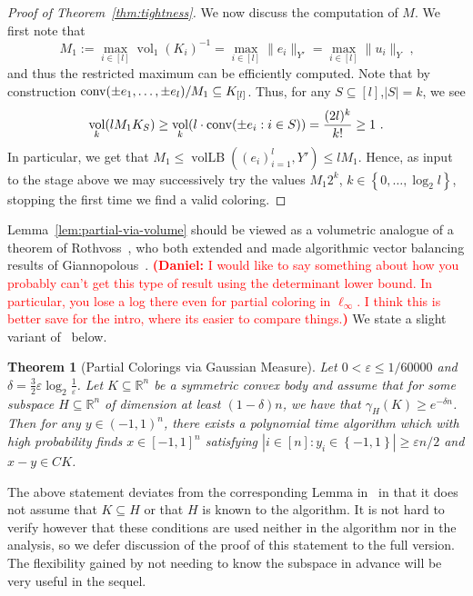 \documentclass[12pt]{article}
\newtheorem{theorem}{Theorem}
\newcommand{\R}{{\mathbb{R}}}
\newcommand\eps{\varepsilon}
\newcommand{\set}[1]{\left\{ #1 \right\}}
\DeclareMathOperator{\vollb}{volLB}
\DeclareMathOperator{\vol}{vol}
\newcommand{\notename}[2]{{\textcolor{red}{{\bf (#1:} {#2}{\bf ) }}}}
\newcommand{\notename}[2]{{\textcolor{red}{\footnotesize{\bf (#1:} {#2}{\bf ) }}}}
\newcommand{\dnote}[1]{{\notename{Daniel}{#1}}}
\newcommand{\notename}[2]{{}}
\newcommand{\dnote}[1]{}
\begin{document}
\begin{proof}[Proof of Theorem~\ref{thm:tightness}]
We now discuss the computation of $M$. We first note that 
\[
M_1 := \max_{i \in [l]} \vol_1(K_i)^{-1} = \max_{i \in [l]} \|e_i\|_{Y'} =
\max_{i \in [l]} \|u_i\|_Y \text{ ,}
\]
and thus the restricted maximum can be efficiently computed. Note that by
construction ${\rm conv}(\pm e_1,\dots, \pm e_l)/M_1 \subseteq K_{[l]}$. Thus,
for any $S \subseteq [l]$,$|S|=k$, we see
\[
\vol_k(l M_1 K_S) \geq \vol_{k}(l \cdot {\rm conv}(\pm e_i: i \in S)) = \frac{(2l)^k}{k!}
 \geq 1 \text{ .}
\]
In particular, we get that $M_1 \leq \vollb((e_i)_{i=1}^l,Y') \leq l M_1$.
Hence, as input to the stage above we may successively try the values $M_1
2^k$, $k \in \set{0,\dots,\log_2 l}$, stopping the first time we find a valid
coloring. 
\end{proof}

Lemma~\ref{lem:partial-via-volume} should be viewed as a volumetric analogue of
a theorem of Rothvoss~\cite{rothvoss-giann}, who both extended and made
algorithmic vector balancing results of Giannopolous~\cite{giannop}. \dnote{I
would like to say something about how you probably can't get this type of result
using the determinant lower bound. In particular, you lose a log there even for
partial coloring in $\ell_\infty$. I think this is better save for the intro,
where its easier to compare things.} We state a slight variant of~\cite[Lemma 9]{rothvoss-giann} below.

\begin{theorem}[Partial Colorings via Gaussian Measure]\label{thm:roth-giann}
Let $0 < \eps \leq 1/60000$ and $\delta = \frac{3}{2}\eps \log_2
\frac{1}{\eps}$. Let $K \subseteq \R^n$ be a symmetric convex body and assume
that for some subspace $H \subseteq \R^n$ of dimension at least $(1-\delta)n$,
we have that $\gamma_H(K) \geq e^{-\delta n}$. Then for any $y \in (-1,1)^n$,
there exists a polynomial time algorithm which with high probability finds $x
\in [-1,1]^n$ satisfying $|i \in [n]: y_i \in \set{-1,1}| \geq \eps n/2$ and
$x-y \in CK$.
\end{theorem}

The above statement deviates from the corresponding Lemma
in~\cite{rothvoss-giann} in that it does not assume that $K \subseteq H$ or that
$H$ is known to the algorithm. It is not hard to verify however that these
conditions are used neither in the algorithm nor in the analysis, so we defer
discussion of the proof of this statement to the full version. The flexibility
gained by not needing to know the subspace in advance will be very useful in the
sequel.
\end{document}
